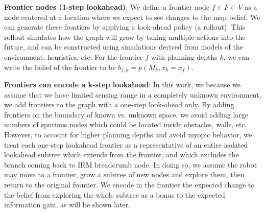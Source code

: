 \documentclass{article}
\newcommand{\ph}[1]{{\textbf{#1}:}} %
\begin{document}
\ph{Frontier nodes (1-step lookahead)}
We define a frontier node $f\in F\subset V$ as a node centered at a location where we expect to see changes to the map belief.  We can generate these frontiers by applying a look-ahead policy (a rollout).  This rollout simulates how the graph will grow by taking multiple actions into the future, and can be constructed using simulations derived from models of the environment, heuristics, etc.  For the frontier $f$ with planning depths $k$, we can write the belief of the frontier to be $b_{f,k} = p(M_k, x_k = x_f)$.

\ph{Frontiers can encode a k-step lookahead}
In this work, we because we assume that we have limited sensing range in a completely unknown environment, we add frontiers to the graph with a one-step look-ahead only.  By adding frontiers on the boundary of known vs. unknown space, we avoid adding large numbers of spurious nodes which could be located inside obstacles, walls, etc.  However, to account for higher planning depths and avoid myopic behavior, we treat each one-step lookahead frontier as a representative of an entire isolated lookahead  subtree which extends from the frontier, and which excludes the branch coming back to IRM breadcrumb node.  In doing so, we assume the robot may move to a frontier, grow a subtree of new nodes and explore them, then return to the original frontier.  We encode in the frontier the expected change to the belief from exploring the whole subtree as a bonus to the expected information gain, as will be shown later.
\end{document}
